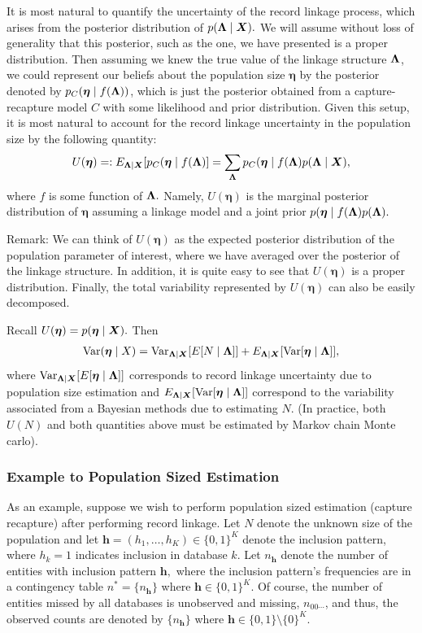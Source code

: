 \documentclass[twoside]{article}
\newcommand{\h}{\boldsymbol{h}}
\newcommand{\Var}{\text{Var}}
\newcommand{\pop}{\boldsymbol{\eta}}
\begin{document}
It is most natural to quantify the uncertainty of the record linkage process, which arises from the posterior distribution of $p(\boldsymbol{\Lambda} \mid \bm{X}).$ 
%
We will assume without loss of generality that this posterior, such as the one, we have presented is a proper distribution. Then assuming we knew the true value of the linkage structure $\boldsymbol{\Lambda}$, we could represent our beliefs about the population size $\pop$ by the posterior denoted by $p_C(\pop \mid f(\lam))$, which is just the posterior obtained from a capture-recapture model $C$ with some likelihood and prior distribution. Given this setup, it is most natural to account for the record linkage uncertainty in the population size by the following quantity:
\begin{align}
\label{eqn:average-linkage}
U(\pop) =: E_{\lam \mid \bX} [p_C(\pop \mid f(\lam)] = \sum_{\lam} p_C(\pop\mid f(\lam) p(\lam \mid \bX),
\end{align}
where $f$ is some function of $\boldsymbol{\Lambda}.$ Namely, $U(\pop)$ is the marginal posterior distribution of $\pop$ assuming a linkage model and a joint prior $p(\pop \mid f(\lam) p(\lam).$

Remark: We can think of $U(\pop)$ as the expected posterior distribution of the population parameter of interest, where we have averaged over the posterior of the linkage structure. In addition, it is quite easy to see that $U(\pop)$ is a proper distribution. Finally, the total variability represented by $U(\pop)$ can also be easily decomposed. 

Recall $U(\pop) = p(\pop \mid \bX).$ Then 
\begin{align}
\Var (\pop \mid X) = \Var_{\lam \mid \bX} [E[N \mid \lam ]] + E_{\lam \mid \bX} [\Var[\pop \mid \lam ]],
\end{align}
where
$\Var_{\lam \mid \bX} [E[\pop \mid \lam ]]$
corresponds to record linkage uncertainty due to population size estimation and 
$E_{\lam \mid \bX} [\Var[\pop \mid \lam ]]$
correspond to the variability associated from a Bayesian methods due to estimating $N.$ (In practice, both $U(N)$ and both quantities above must be estimated by Markov chain Monte carlo).

\subsubsection{Example to Population Sized Estimation}
As an example, suppose we wish to perform population sized estimation (capture recapture) after performing record linkage. Let $N$ denote the unknown size of the population and let  $\h =(h_1,\ldots,h_K) \in \{0,1\}^K$ denote the inclusion pattern, where $h_k=1$ indicates inclusion in database $k.$ Let $n_{\h}$ denote the number of entities with inclusion pattern $\h,$ where the inclusion pattern's frequencies are in a contingency table $n^* = \{n_{\h} \}$ where $\h \in \{0,1\}^K.$ Of course, the number of entities missed by all databases is unobserved and missing, $n_{00\cdots}$, and thus, the observed counts are denoted by $\{n_{\h} \}$ where $\h \in \{0,1\} \setminus \{0\}^K.$
\end{document}
